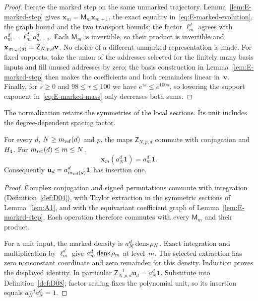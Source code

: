 \begin{proof}
Iterate the marked step on the same unmarked trajectory. Lemma~\ref{lem:E-marked-step} gives $\mathbf x_m=\mathsf M_m\mathbf x_{m+1}$, the exact equality in~\eqref{eq:E-marked-evolution}, the graph bound and the two transport bounds; the factor $\ell_m^d$ agrees with $a_m^d=\ell_m^da_{m+1}^d$. Each $\mathsf M_m$ is invertible, so their product is invertible and $\mathbf x_{m_{\mathrm{ref}}(d)}=\mathsf Z_{N,p,d}\mathbf v$. No choice of a different unmarked representation is made. For fixed supports, take the union of the addresses selected for the finitely many basis inputs and fill unused addresses by zero; the basis construction in Lemma~\ref{lem:E-marked-step} then makes the coefficients and both remainders linear in~$\mathbf v$. Finally, for $s\ge0$ and $98\le\tau\le100$ we have $e^{\tau s}\le e^{100s}$, so lowering the support exponent in~\eqref{eq:E-marked-mass} only decreases both sums.
\end{proof}

The normalization retains the symmetries of the local sections. Its unit includes the degree-dependent spacing factor.
\begin{lemma}\label{lem:E2.1a}
For every $d$, $N\ge m_{\mathrm{ref}}(d)$ and $p$, the maps $\mathsf Z_{N,p,d}$ commute with conjugation and~$H_4$. For $m_{\mathrm{ref}}(d)\le m\le N$,
\begin{equation*}
\mathbf x_m(a_N^d\mathbf1)=a_m^d\mathbf1.
\end{equation*}
Consequently $\mathbf u_d=a_{m_{\mathrm{ref}}(d)}^d\mathbf1$ has insertion one.
\end{lemma}
\begin{proof}
Complex conjugation and signed permutations commute with integration (Definition~\ref{def:D04}), with Taylor extraction in the symmetric sections of Lemma~\ref{lem:A1}, and with the equivariant coefficient graph of Lemma~\ref{lem:E-marked-step}. Each operation therefore commutes with every $\mathsf M_m$ and their product.

For a unit input, the marked density is $a_N^d\operatorname{dens}\rho_N$. Exact integration and multiplication by $\ell_m^d$ give $a_m^d\operatorname{dens}\rho_m$ at level~$m$. The selected extraction has zero nonconstant coordinate and zero remainder for this density. Induction proves the displayed identity. In particular
$\mathsf Z_{N,p,d}^{-1}\mathbf u_d=a_N^d\mathbf1$. Substitute into Definition~\ref{def:D08}; factor scaling fixes the polynomial unit, so its insertion equals $a_N^{-d}a_N^d=1$.
\end{proof}

